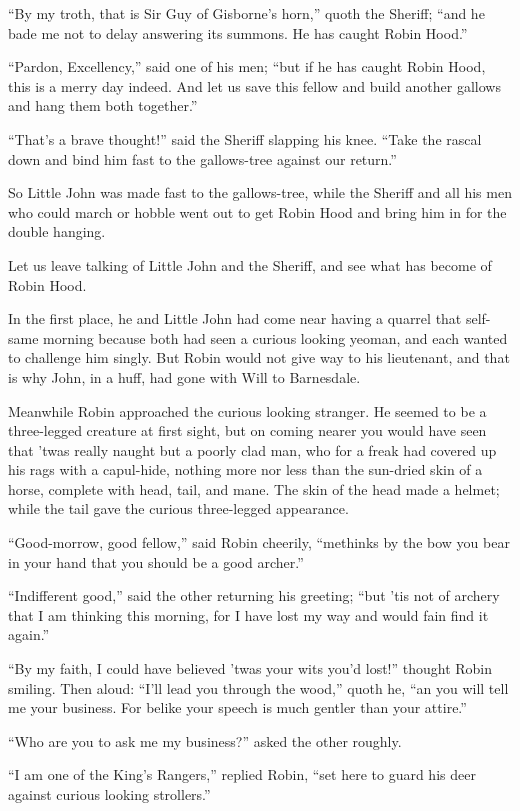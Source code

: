 ``By my troth, that is Sir Guy of Gisborne's horn,'' quoth the Sheriff;
``and he bade me not to delay answering its summons. He has caught Robin
Hood.''

``Pardon, Excellency,'' said one of his men; ``but if he has caught
Robin Hood, this is a merry day indeed. And let us save this fellow and
build another gallows and hang them both together.''

``That's a brave thought!'' said the Sheriff slapping his knee. ``Take
the rascal down and bind him fast to the gallows-tree against our
return.''

So Little John was made fast to the gallows-tree, while the Sheriff and
all his men who could march or hobble went out to get Robin Hood and
bring him in for the double hanging.

Let us leave talking of Little John and the Sheriff, and see what has
become of Robin Hood.

In the first place, he and Little John had come near having a quarrel
that self-same morning because both had seen a curious looking yeoman,
and each wanted to challenge him singly. But Robin would not give way to
his lieutenant, and that is why John, in a huff, had gone with Will to
Barnesdale.

Meanwhile Robin approached the curious looking stranger. He seemed to be
a three-legged creature at first sight, but on coming nearer you would
have seen that 'twas really naught but a poorly clad man, who for a
freak had covered up his rags with a capul-hide, nothing more nor less
than the sun-dried skin of a horse, complete with head, tail, and mane.
The skin of the head made a helmet; while the tail gave the curious
three-legged appearance.

``Good-morrow, good fellow,'' said Robin cheerily, ``methinks by the bow
you bear in your hand that you should be a good archer.''

``Indifferent good,'' said the other returning his greeting; ``but 'tis
not of archery that I am thinking this morning, for I have lost my way
and would fain find it again.''

``By my faith, I could have believed 'twas your wits you'd lost!''
thought Robin smiling. Then aloud: ``I'll lead you through the wood,''
quoth he, ``an you will tell me your business. For belike your speech is
much gentler than your attire.''

``Who are you to ask me my business?'' asked the other roughly.

``I am one of the King's Rangers,'' replied Robin, ``set here to guard
his deer against curious looking strollers.''


